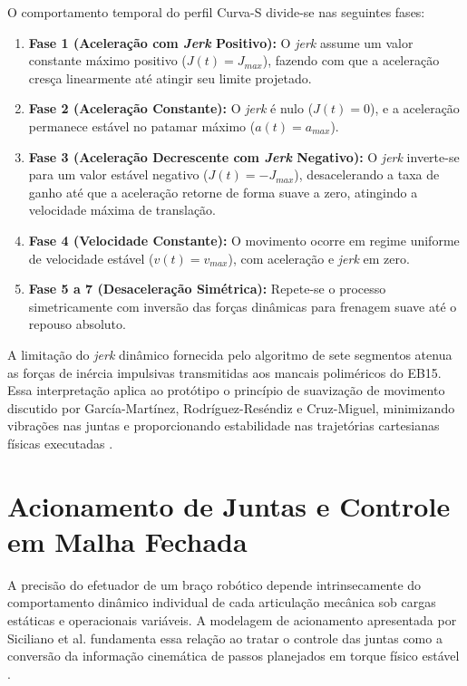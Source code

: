 O comportamento temporal do perfil Curva-S divide-se nas seguintes fases:
\begin{enumerate}
    \item \textbf{Fase 1 (Aceleração com \textit{Jerk} Positivo):} O \textit{jerk} assume um valor constante máximo positivo ($J(t) = J_{max}$), fazendo com que a aceleração cresça linearmente até atingir seu limite projetado.
    \item \textbf{Fase 2 (Aceleração Constante):} O \textit{jerk} é nulo ($J(t) = 0$), e a aceleração permanece estável no patamar máximo ($a(t) = a_{max}$).
    \item \textbf{Fase 3 (Aceleração Decrescente com \textit{Jerk} Negativo):} O \textit{jerk} inverte-se para um valor estável negativo ($J(t) = -J_{max}$), desacelerando a taxa de ganho até que a aceleração retorne de forma suave a zero, atingindo a velocidade máxima de translação.
    \item \textbf{Fase 4 (Velocidade Constante):} O movimento ocorre em regime uniforme de velocidade estável ($v(t) = v_{max}$), com aceleração e \textit{jerk} em zero.
    \item \textbf{Fase 5 a 7 (Desaceleração Simétrica):} Repete-se o processo simetricamente com inversão das forças dinâmicas para frenagem suave até o repouso absoluto.
\end{enumerate}

A limitação do \textit{jerk} dinâmico fornecida pelo algoritmo de sete segmentos atenua as forças de inércia impulsivas transmitidas aos mancais poliméricos do EB15. Essa interpretação aplica ao protótipo o princípio de suavização de movimento discutido por García-Martínez, Rodríguez-Reséndiz e Cruz-Miguel, minimizando vibrações nas juntas e proporcionando estabilidade nas trajetórias cartesianas físicas executadas \cite{garcia2019new}.

\section{Acionamento de Juntas e Controle em Malha Fechada}
\label{sec:acionamento_juntas}

A precisão do efetuador de um braço robótico depende intrinsecamente do comportamento dinâmico individual de cada articulação mecânica sob cargas estáticas e operacionais variáveis. A modelagem de acionamento apresentada por Siciliano et al. fundamenta essa relação ao tratar o controle das juntas como a conversão da informação cinemática de passos planejados em torque físico estável \cite{siciliano2009robotics}.

